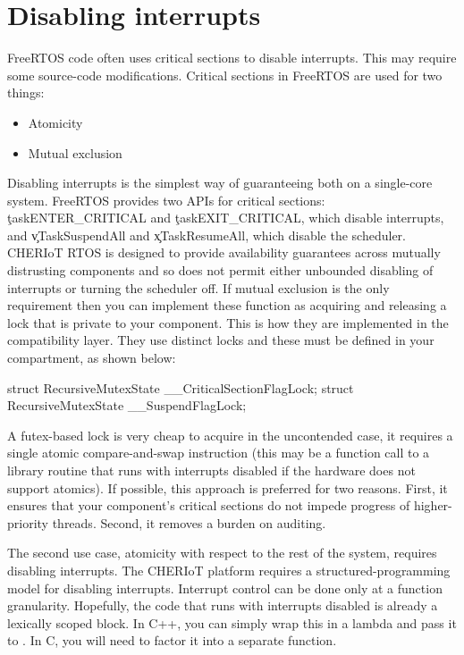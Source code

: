 \section{Disabling interrupts}

FreeRTOS code often uses critical sections to disable interrupts.
This may require some source-code modifications.
Critical sections in FreeRTOS are used for two things:

\begin{itemize}
	\item{Atomicity}
	\item{Mutual exclusion}
\end{itemize}

Disabling interrupts is the simplest way of guaranteeing both on a single-core system.
FreeRTOS provides two APIs for critical sections: \c{taskENTER_CRITICAL} and \c{taskEXIT_CRITICAL}, which disable interrupts, and \c{vTaskSuspendAll} and \c{xTaskResumeAll}, which disable the scheduler.
CHERIoT RTOS is designed to provide availability guarantees across mutually distrusting components and so does not permit either unbounded disabling of interrupts or turning the scheduler off.
If mutual exclusion is the only requirement then you can implement these function as acquiring and releasing a lock that is private to your component.
This is how they are implemented in the compatibility layer.
They use distinct locks and these must be defined in your compartment, as shown below:

\begin{cxxsnippet}
struct RecursiveMutexState __CriticalSectionFlagLock;
struct RecursiveMutexState __SuspendFlagLock;
\end{cxxsnippet}

A futex-based lock is very cheap to acquire in the uncontended case, it requires a single atomic compare-and-swap instruction (this may be a function call to a library routine that runs with interrupts disabled if the hardware does not support atomics).
If possible, this approach is preferred for two reasons.
First, it ensures that your component's critical sections do not impede progress of higher-priority threads.
Second, it removes a burden on auditing.

The second use case, atomicity with respect to the rest of the system, requires disabling interrupts.
The CHERIoT platform requires a structured-programming model for disabling interrupts.
Interrupt control can be done only at a function granularity.
Hopefully, the code that runs with interrupts disabled is already a lexically scoped block.
In C++, you can simply wrap this in a lambda and pass it to .
In C, you will need to factor it into a separate function.


